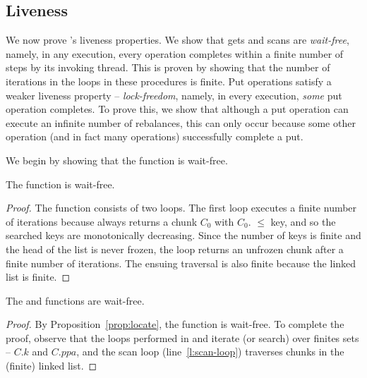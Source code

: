

\subsection{Liveness}
\label{sec:live}

We now prove \kiwi's liveness properties. 
We show that gets and scans are \emph{wait-free}, namely, in any execution, every operation completes within a finite number of steps by its invoking thread. 
 This is proven  by showing that the number of iterations in the loops in these procedures is finite. 
 Put operations satisfy a weaker liveness property --  \emph{lock-freedom}, namely, in every execution, \emph{some} put operation completes.
To prove this, we show that although a put operation can execute an infinite number of rebalances, this can only occur because 
some other operation (and in fact many operations) successfully complete a put.

We begin by showing that the  function is wait-free. 
\begin{proposition}  
The   function is wait-free.
\label{prop:locate}
\end{proposition}
\begin{proof}
The function consists of two loops. The first loop 
executes a finite number of iterations because  always returns a chunk $C_0$ with $C_0$. $\le$ key,
and so the searched keys are monotonically decreasing.  Since the number of keys is finite and the head of the list is never frozen, the loop
returns an unfrozen chunk after a finite number of iterations. The ensuing traversal is also finite because the linked list is finite. 
\end{proof}

\begin{lemma}
The   and  functions are wait-free.
\end{lemma}
\begin{proof}
By Proposition~\ref{prop:locate}, the  function is wait-free. 
To complete the proof, observe that the loops performed in  and 
 iterate (or search) over finites sets -- $C.k$ and $C.ppa$, and the scan loop (line~\ref{l:scan-loop}) traverses
 chunks in the (finite) linked list. 
\end{proof}

